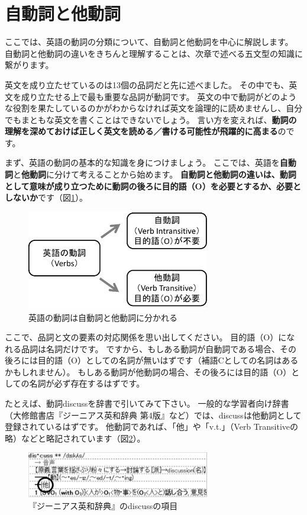 \documentclass[titlepage]{jsarticle}
\begin{document}
  \newpage
 \section{自動詞と他動詞}
 ここでは、英語の動詞の分類について、自動詞と他動詞を中心に解説します。
 自動詞と他動詞の違いをきちんと理解することは、次章で述べる五文型の知識に繋がります。

 英文を成り立たせているのは13個の品詞だと先に述べました。
 その中でも、英文を成り立たせる上で最も重要な品詞が動詞です。
 英文の中で動詞がどのような役割を果たしているのかがわからなければ英文を論理的に読めませんし、自分でもまともな英文を書くことはできないでしょう。
 言い方を変えれば、{\bf 動詞の理解を深めておけば正しく英文を読める／書ける可能性が飛躍的に高まる}のです。

 まず、英語の動詞の基本的な知識を身につけましょう。
 ここでは、英語を{\bf 自動詞}と{\bf 他動詞}に分けて考えることから始めます。
 {\bf 自動詞と他動詞の違いは、動詞として意味が成り立つために動詞の後ろに目的語（O）を必要とするか、必要としないか}です（図\ref{fig7}）。
  \begin{figure}[htbp]
   \begin{center}
    \includegraphics[width=8cm]{./figure/fig7.pdf}
    \caption{英語の動詞は自動詞と他動詞に分かれる}
    \label{fig7}
   \end{center}
  \end{figure}

  ここで、品詞と文の要素の対応関係を思い出してください。
  目的語（O）になれる品詞は名詞だけです。
  ですから、もしある動詞が自動詞である場合、その後ろには目的語（O）としての名詞が無いはずです（補語Cとしての名詞はあるかもしれません）。
  もしある動詞が他動詞の場合、その後ろには目的語（O）としての名詞が必ず存在するはずです。

  たとえば、動詞discussを辞書で引いてみて下さい。
  一般的な学習者向け辞書（大修館書店『ジーニアス英和辞典 第4版』など）では、discussは他動詞として登録されているはずです。
  他動詞であれば、「他」や「v.t.」（Verb Transitiveの略）などと略記されています（図\ref{fig8}）。
  \begin{figure}[htbp]
   \begin{center}
    \includegraphics[width=8cm]{./figure/fig8.pdf}
    \caption{『ジーニアス英和辞典』のdiscussの項目}
    \label{fig8}
   \end{center}
  \end{figure}
\end{document}
